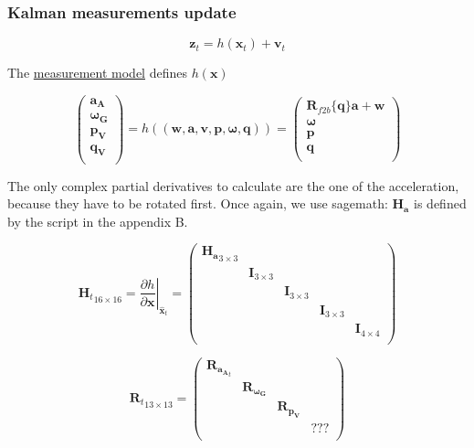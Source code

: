\documentclass[]{article}
\begin{document}
\subsubsection{Kalman measurements
update}\label{kalman-measurements-update}

\[\mathbf{z}_t = h(\mathbf{x}_t) + \mathbf{v}_t\]

The \protect\hyperlink{measurements-model}{measurement model} defines
\(h(\mathbf{x})\)

\[\left( \begin{array}{c}
\mathbf{a_A}\\
\mathbf{\boldsymbol{\omega}_G}\\
\mathbf{p_V}\\
\mathbf{q_V}\\
\end{array} \right) = h((\mathbf{w}, \mathbf{a}, \mathbf{v}, \mathbf{p}, \boldsymbol{\omega}, \mathbf{q})) = \left( \begin{array}{c}
\mathbf{R}_{f2b}\{\mathbf{q}\}\mathbf{a} + \mathbf{w}\\
\boldsymbol{\omega}\\
\mathbf{p}\\
\mathbf{q}\\
\end{array} \right)\]

The only complex partial derivatives to calculate are the one of the
acceleration, because they have to be rotated first. Once again, we use
sagemath: \(\mathbf{H_a}\) is defined by the script in the appendix B.

\[{\mathbf{H}_t}_{16 \times 16} = \left . \frac{\partial h}{\partial \mathbf{x} } \right \vert _{\hat{\mathbf{x}}_{t}} = \left( \begin{array}{ccccc}
\mathbf{H_a}_{3 \times 3} & & & & \\
& \mathbf{I}_{3 \times 3} & & & \\
& & \mathbf{I}_{3 \times 3} & & \\
& & & \mathbf{I}_{3 \times 3} &  \\
& & & & \mathbf{I}_{4 \times 4}  \\
\end{array} \right)\]

\[{\mathbf{R}_t}_{13 \times 13} = 
\left( \begin{array}{cccc}
\mathbf{R}_{\mathbf{a_A}_t} & & & \\
& \mathbf{R}_{\mathbf{\boldsymbol{\omega}_G}} & & \\
& & \mathbf{R}_{\mathbf{p_V}} & \\
& & & ???\\
\end{array} \right)\]
\end{document}

